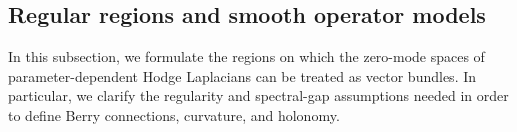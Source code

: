 \documentclass[10pt,a4paper]{amsart}
\begin{document}












\subsection{Regular regions and smooth operator models}

In this subsection, we formulate the regions on which the zero-mode spaces of
parameter-dependent Hodge Laplacians can be treated as vector bundles. In
particular, we clarify the regularity and spectral-gap assumptions needed in
order to define Berry connections, curvature, and holonomy.
\end{document}
